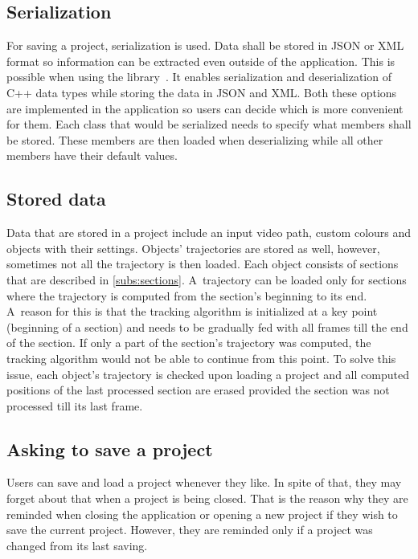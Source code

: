 \subsection{Serialization}
For saving a project, serialization is used. Data shall be stored in JSON or XML format so information can be extracted even outside of the application. This is possible when using the  library~\cite{cereal}. It enables serialization and deserialization of C++ data types while storing the data in JSON and XML. Both these options are implemented in the application so users can decide which is more convenient for them. Each class that would be serialized needs to specify what members shall be stored. These members are then loaded when deserializing while all other members have their default values.

\subsection{Stored data}
Data that are stored in a project include an input video path, custom colours and objects with their settings. Objects' trajectories are stored as well, however, sometimes not all the trajectory is then loaded. Each object consists of sections that are described in \autoref{subs:sections}. A~trajectory can be loaded only for sections where the trajectory is computed from the section's beginning to its end. A~reason for this is that the tracking algorithm is initialized at a key point (beginning of a section) and needs to be gradually fed with all frames till the end of the section. If only a part of the section's trajectory was computed, the tracking algorithm would not be able to continue from this point. To solve this issue, each object's trajectory is checked upon loading a project and all computed positions of the last processed section are erased provided the section was not processed till its last frame.

\subsection{Asking to save a project}
Users can save and load a project whenever they like. In spite of that, they may forget about that when a project is being closed. That is the reason why they are reminded when closing the application or opening a new project if they wish to save the current project. However, they are reminded only if a project was changed from its last saving. 

